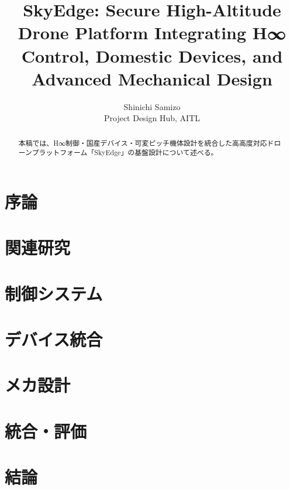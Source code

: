 \documentclass[conference]{IEEEtran}
\title{SkyEdge: Secure High-Altitude Drone Platform Integrating H∞ Control, Domestic Devices, and Advanced Mechanical Design}
\author{Shinichi Samizo \\ Project Design Hub, AITL}
\begin{document}
\maketitle

\begin{abstract}
本稿では、H∞制御・国産デバイス・可変ピッチ機体設計を統合した高高度対応ドローンプラットフォーム「SkyEdge」の基盤設計について述べる。
\end{abstract}

\section{序論}

\section{関連研究}

\section{制御システム}

\section{デバイス統合}

\section{メカ設計}

\section{統合・評価}

\section{結論}



\end{document}
